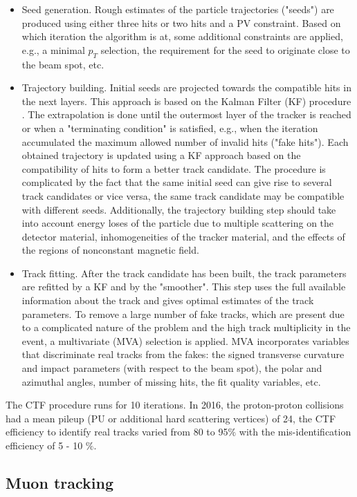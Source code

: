\begin{itemize}
\item Seed generation. Rough estimates of the particle trajectories ("seeds") are produced using either three hits or two hits and a PV constraint. Based on which iteration the algorithm is at, some additional constraints are applied, e.g., a minimal $p_T$ selection, the requirement for the seed to originate close to the beam spot, etc. 
\item Trajectory building. Initial seeds are projected towards the compatible hits in the next layers. This approach is based on the Kalman Filter (KF) procedure \cite{Kalman_filter}. The extrapolation is done until the outermost layer of the tracker is reached or when a "terminating condition" is satisfied, e.g., when the iteration accumulated the maximum allowed number of invalid hits ("fake hits"). Each obtained trajectory is updated using a KF approach based on the compatibility of hits to form a better track candidate. The procedure is complicated by the fact that the same initial seed can give rise to several track candidates or vice versa, the same track candidate may be compatible with different seeds. Additionally, the trajectory building step should take into account energy loses of the particle due to multiple scattering on the detector material, inhomogeneities of the tracker material, and the effects of the regions of nonconstant magnetic field. 
\item Track fitting. After the track candidate has been built, the track parameters are refitted by a KF and by the "smoother". This step uses the full available information about the track and gives optimal estimates of the track parameters. To remove a large number of fake tracks, which are present due to a  complicated nature of the problem and the high track multiplicity in the event, a multivariate (MVA) selection is applied. MVA incorporates variables that discriminate real tracks from the fakes: the signed transverse curvature and impact parameters (with respect to the beam spot), the polar and azimuthal angles, number of missing hits, the fit quality variables, etc. 
\end{itemize}

The CTF procedure runs for 10 iterations. In 2016, the proton-proton collisions had a mean pileup (PU or additional hard scattering vertices) of 24, the CTF efficiency to identify real tracks varied from 80 to 95$\%$ with the mis-identification efficiency of 5 - 10 $\%$.

\subsection{Muon tracking}\label{sec:muon_track_reconstruction}

